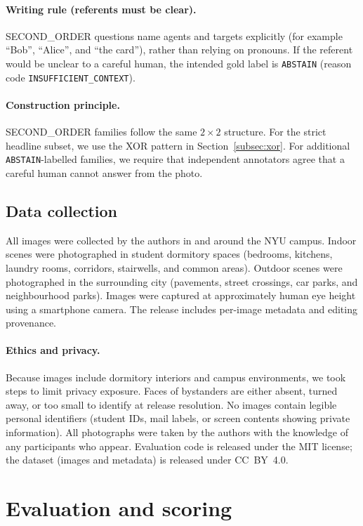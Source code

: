\documentclass[11pt]{article}
\begin{document}
\paragraph{Writing rule (referents must be clear).}
SECOND\_ORDER questions name agents and targets explicitly (for example ``Bob'', ``Alice'', and ``the card''), rather than relying on pronouns. If the referent would be unclear to a careful human, the intended gold label is \texttt{ABSTAIN} (reason code \texttt{INSUFFICIENT\_CONTEXT}).

\paragraph{Construction principle.}
SECOND\_ORDER families follow the same \(2 \times 2\) structure. For the strict headline subset, we use the XOR pattern in Section~\ref{subsec:xor}. For additional \texttt{ABSTAIN}-labelled families, we require that independent annotators agree that a careful human cannot answer from the photo.

\subsection{Data collection}

All images were collected by the authors in and around the NYU campus. Indoor scenes were photographed in student dormitory spaces (bedrooms, kitchens, laundry rooms, corridors, stairwells, and common areas). Outdoor scenes were photographed in the surrounding city (pavements, street crossings, car parks, and neighbourhood parks). Images were captured at approximately human eye height using a smartphone camera. The release includes per-image metadata and editing provenance.

\paragraph{Ethics and privacy.}
Because images include dormitory interiors and campus environments, we took steps to limit privacy exposure. Faces of bystanders are either absent, turned away, or too small to identify at release resolution. No images contain legible personal identifiers (student IDs, mail labels, or screen contents showing private information). All photographs were taken by the authors with the knowledge of any participants who appear. Evaluation code is released under the MIT license; the dataset (images and metadata) is released under CC~BY~4.0.

\section{Evaluation and scoring}
\label{sec:evaluation}
\end{document}
